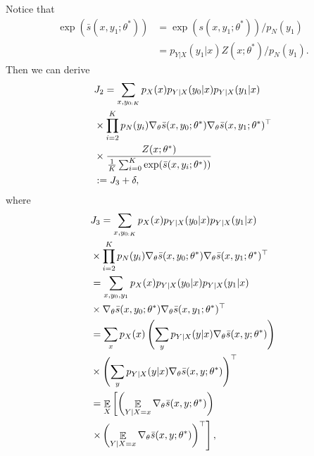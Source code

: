 \documentclass[11pt,a4paper]{article}
\DeclareMathOperator{\E}{\mathbb{E}}
\newcommand{\gtheta}{\ensuremath \nabla_{\theta}}
\newcommand{\str}[3]{s(#1, #2; #3)}
\newcommand{\ssf}[3]{\bar{s}(#1, #2; #3)}
\begin{document}
Notice that 
\begin{equation*}
\begin{aligned}
\exp(  \ssf{x}{y_1}{\theta^*}) & = \exp(  \str{x}{y_1}{\theta^*} ) / p_N(y_1) \\
& = p_{Y|X}(y_1|x)Z(x; \theta^*) / p_N(y_1).
\end{aligned}
\end{equation*}
Then we can derive
    \begin{equation}
  \begin{aligned}
  & J_2 = \sum_{x, y_{0:K}} p_X(x)p_{Y|X}(y_0|x)p_{Y|X}(y_1|x)  \\
  &  \times\prod_{i=2}^K p_N(y_i)  \gtheta \ssf{x}{y_0}{\theta^*}\gtheta   \ssf{x}{y_1}{\theta^*}^\top   \\
  &  \times \frac{Z(x; \theta^*)}{\frac{1}{K}\sum_{i=0}^K \exp( \ssf{x}{y_i}{\theta^*})}  \\
& := J_3 + \delta, 
  \end{aligned}
  \nonumber
  \end{equation} 
where 
\begin{equation*}
\begin{aligned}
& J_3  = \sum_{x, y_{0:K}} p_X(x)p_{Y|X}(y_0|x)p_{Y|X}(y_1|x)  \\
& \times \prod_{i=2}^K p_N(y_i) \gtheta \ssf{x}{y_0}{\theta^*}\gtheta   \ssf{x}{y_1}{\theta^*}^\top  \\
& = \sum_{x, y_0, y_1}  p_X(x)p_{Y|X}(y_0|x)p_{Y|X}(y_1|x) \\
&  \times \gtheta \ssf{x}{y_0}{\theta^*}\gtheta   \ssf{x}{y_1}{\theta^*}^\top   \\
& = \sum_{x} p_X(x)\left(\sum_{y}p_{Y|X}(y|x)\gtheta \ssf{x}{y}{\theta^*}\right)\\
&\times \left(\sum_{y}p_{Y|X}(y|x)\gtheta \ssf{x}{y}{\theta^*}\right)^\top\\
& = \E_X \left[ \left(\E_{Y|X = x}\gtheta \ssf{x}{y}{\theta^*}\right) \right.\\
& \left. \times  \left(\E_{Y|X = x}\gtheta \ssf{x}{y}{\theta^*}\right)^\top \right],
\end{aligned}
\end{equation*}
\end{document}
